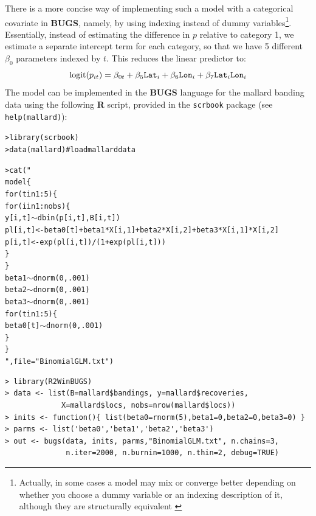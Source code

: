 There is a more concise way of implementing such a model with a
categorical covariate in {\bf BUGS}, namely, by using indexing instead
of dummy variables\footnote{Actually, in some cases a model may mix or
  converge better depending on whether you choose a dummy variable or
  an indexing description of it, although they are structurally
  equivalent \citep{kery:2010}}. Essentially, instead of estimating
the difference in $p$ relative to category 1, we estimate a separate
intercept term for each category, so that we have 5 different $\beta_0$
parameters indexed by $t$. This reduces the linear predictor to:
\[
\mbox{logit}(p_{it}) = \beta_{0t} +  \beta_5 \mbox{\tt Lat}_i + \beta_6
\mbox{\tt Lon}_i + \beta_7 \mbox{\tt Lat}_i \mbox{\tt Lon}_i
\]
The model can be implemented in the {\bf BUGS} language for the
mallard banding data using the following {\bf R} script, provided in
the \mbox{\tt scrbook} package (see \mbox{\tt help(mallard)}): 
{\small
\begin{alltt}
> library(scrbook)
> data(mallard)    # load mallard data

> cat("
model\{
 for(t in 1:5)\{
    for (i in 1:nobs)\{
       y[i,t] \(\sim\) dbin(p[i,t], B[i,t])
       pl[i,t] <- beta0[t]+beta1*X[i,1]+beta2*X[i,2]+beta3*X[i,1]*X[i,2]
       p[i,t] <- exp(pl[i,t])/(1+exp(pl[i,t]))
     \}
 \}
	beta1 \(\sim\) dnorm(0,.001)
	beta2 \(\sim\) dnorm(0,.001)
	beta3 \(\sim\) dnorm(0,.001)
	for(t in 1:5)\{
 	beta0[t] \(\sim\) dnorm(0,.001)  
        \}
\}
",file="BinomialGLM.txt")
\end{alltt}
}
{\small
\begin{verbatim}
> library(R2WinBUGS)
> data <- list(B=mallard$bandings, y=mallard$recoveries,
             X=mallard$locs, nobs=nrow(mallard$locs))
> inits <- function(){ list(beta0=rnorm(5),beta1=0,beta2=0,beta3=0) }
> parms <- list('beta0','beta1','beta2','beta3')
> out <- bugs(data, inits, parms,"BinomialGLM.txt", n.chains=3,
              n.iter=2000, n.burnin=1000, n.thin=2, debug=TRUE)
\end{verbatim}
}

